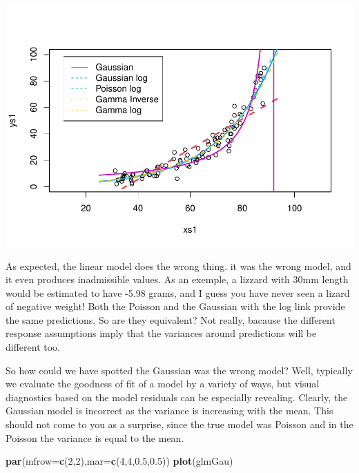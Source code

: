\documentclass[
]{book}
\newenvironment{Shaded}{\begin{snugshade}}{\end{snugshade}}
\newcommand{\DataTypeTok}[1]{\textcolor[rgb]{0.13,0.29,0.53}{#1}}
\newcommand{\DecValTok}[1]{\textcolor[rgb]{0.00,0.00,0.81}{#1}}
\newcommand{\FloatTok}[1]{\textcolor[rgb]{0.00,0.00,0.81}{#1}}
\newcommand{\KeywordTok}[1]{\textcolor[rgb]{0.13,0.29,0.53}{\textbf{#1}}}
\newcommand{\NormalTok}[1]{#1}
\begin{document}
\includegraphics{ECOMODbook_files/figure-latex/glm4-1.pdf}

As expected, the linear model does the wrong thing. it was the wrong model, and it even produces inadmissible values. As an exemple, a lizzard with 30mm length would be estimated to have -5.98 grams, and I guess you have never seen a lizard of negative weight! Both the Poisson and the Gaussian with the log link provide the same predictions. So are they equivalent? Not really, bacause the different response assumptions imply that the variances around predictions will be different too.

So how could we have spotted the Gaussian was the wrong model? Well, typically we evaluate the goodness of fit of a model by a variety of ways, but visual diagnostics based on the model residuals can be especially revealing. Clearly, the Gaussian model is incorrect as the variance is increasing with the mean. This should not come to you as a surprise, since the true model was Poisson and in the Poisson the variance is equal to the mean.

\begin{Shaded}
\begin{Highlighting}[]
\KeywordTok{par}\NormalTok{(}\DataTypeTok{mfrow=}\KeywordTok{c}\NormalTok{(}\DecValTok{2}\NormalTok{,}\DecValTok{2}\NormalTok{),}\DataTypeTok{mar=}\KeywordTok{c}\NormalTok{(}\DecValTok{4}\NormalTok{,}\DecValTok{4}\NormalTok{,}\FloatTok{0.5}\NormalTok{,}\FloatTok{0.5}\NormalTok{))}
\KeywordTok{plot}\NormalTok{(glmGau)}
\end{Highlighting}
\end{Shaded}
\end{document}
